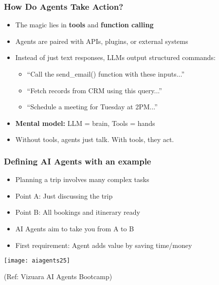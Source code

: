 \begin{frame}[fragile]\frametitle{How Do Agents Take Action?}
\begin{itemize}
    \item The magic lies in \textbf{tools} and \textbf{function calling}
    \item Agents are paired with APIs, plugins, or external systems
    \item Instead of just text responses, LLMs output structured commands:
    \begin{itemize}
        \item ``Call the send\_email() function with these inputs...''
        \item ``Fetch records from CRM using this query...''
        \item ``Schedule a meeting for Tuesday at 2PM...''
    \end{itemize}
    \item \textbf{Mental model:} LLM = brain, Tools = hands
    \item Without tools, agents just talk. With tools, they act.
\end{itemize}
\end{frame}


\begin{frame}[fragile]\frametitle{Defining AI Agents with an example}

      \begin{itemize}
		\item Planning a trip involves many complex tasks
		\item Point A: Just discussing the trip
		\item Point B: All bookings and itinerary ready
		\item AI Agents aim to take you from A to B
		\item First requirement: Agent adds value by saving time/money
      \end{itemize}

		\begin{center}
		\texttt{[image: aiagents25]}
		
		{\tiny (Ref: Vizuara AI Agents Bootcamp)}
		\end{center}	

\end{frame}

